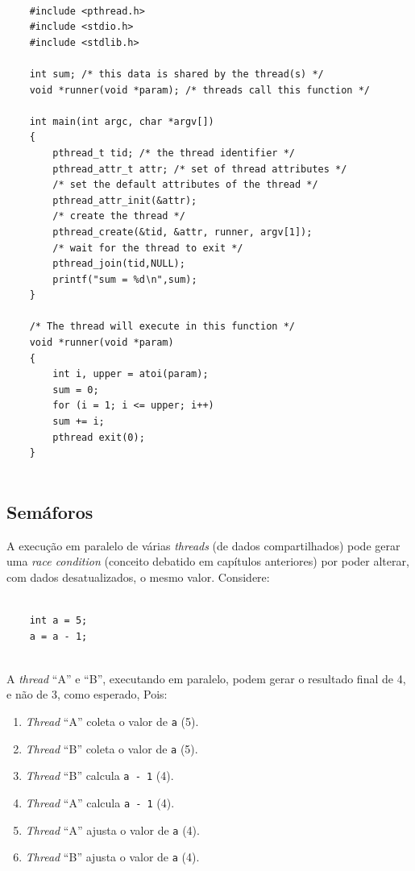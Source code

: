 \begin{verbatim}

    #include <pthread.h>
    #include <stdio.h>
    #include <stdlib.h>
    
    int sum; /* this data is shared by the thread(s) */
    void *runner(void *param); /* threads call this function */
    
    int main(int argc, char *argv[])
    {
        pthread_t tid; /* the thread identifier */
        pthread_attr_t attr; /* set of thread attributes */
        /* set the default attributes of the thread */
        pthread_attr_init(&attr);
        /* create the thread */
        pthread_create(&tid, &attr, runner, argv[1]);
        /* wait for the thread to exit */
        pthread_join(tid,NULL);
        printf("sum = %d∖n",sum);
    }
    
    /* The thread will execute in this function */
    void *runner(void *param)
    {
        int i, upper = atoi(param);
        sum = 0;
        for (i = 1; i <= upper; i++)
        sum += i;
        pthread exit(0);
    }
    
\end{verbatim}


\hypertarget{semuxe1foros}{%
\subsection{Semáforos}\label{semuxe1foros}}

A execução em paralelo de várias \emph{threads} (de dados
compartilhados) pode gerar uma \emph{race condition} (conceito debatido
em capítulos anteriores) por poder alterar, com dados desatualizados, o
mesmo valor. Considere:

\begin{verbatim}

    int a = 5;
    a = a - 1;
    
\end{verbatim}



A \emph{thread} ``A'' e ``B'', executando em paralelo, podem gerar o
resultado final de 4, e não de 3, como esperado, Pois:

\begin{enumerate}
\def\labelenumi{\arabic{enumi}.}
\tightlist
\item
  \emph{Thread} ``A'' coleta o valor de \texttt{a} (5).
\item
  \emph{Thread} ``B'' coleta o valor de \texttt{a} (5).
\item
  \emph{Thread} ``B'' calcula \texttt{a\ -\ 1} (4).
\item
  \emph{Thread} ``A'' calcula \texttt{a\ -\ 1} (4).
\item
  \emph{Thread} ``A'' ajusta o valor de \texttt{a} (4).
\item
  \emph{Thread} ``B'' ajusta o valor de \texttt{a} (4).
\end{enumerate}

